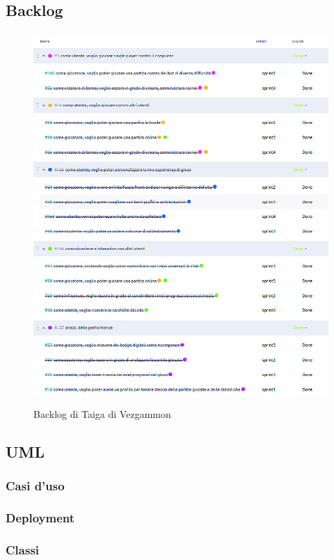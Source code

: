 \documentclass{article}
\begin{document}
\subsection{Backlog} \label{sec:bl}
\begin{figure}[H]
    \centering
    \includegraphics[width=12cm, height=14cm]{backlog}
    \caption{Backlog di Taiga di Vezgammon\textsuperscript{\texttrademark}}
    \label{fig:backlog}
\end{figure}

\subsection{UML}
\subsubsection{Casi d'uso}

\subsubsection{Deployment}

\subsubsection{Classi}
\end{document}
